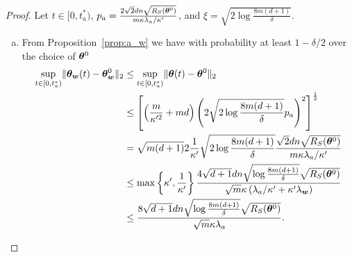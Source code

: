 \documentclass{article}
\begin{document}
\begin{proof}
    Let $t\in[0, t^*_a)$, $p_a=\frac{2\sqrt{2}dn\sqrt{R_S(\bm{\theta}^0)}}{m\kappa\lambda_a/\kappa'}$, and $\xi=\sqrt{2\log\frac{8m(d+1)}{\delta}}$.
    \begin{enumerate}[(a)]
        \item From Proposition~\ref{prop:a_w} we have with probability at least $1-\delta/2$ over the choice of $\bm{\theta}^0$
              \begin{equation*}
                  \begin{aligned}
                      \sup\limits_{t\in[0,t^*_a)}\lVert\bm{\theta}_{\bm{w}}(t)-\bm{\theta}_{\bm{w}}^0\rVert_2
                       & \leq \sup\limits_{t\in[0,t^*_a)}\lVert\bm{\theta}(t)-\bm{\theta}^0\rVert_2                                                                                                                                 \\
                       & \leq \left[\left(\frac{m}{\kappa'^2}+md\right)\left(2\sqrt{2\log\frac{8m(d+1)}{\delta}}p_a\right)^2\right]^{\frac{1}{2}}                                                                      \\
                       & =\sqrt{m(d+1)}2\frac{1}{\kappa'}\sqrt{2\log\frac{8m(d+1)}{\delta}}\frac{\sqrt{2}dn\sqrt{R_S(\bm{\theta}^0)}}{m\kappa\lambda_a/\kappa'}                                                            \\
                       & \leq\max\left\{\kappa',\frac{1}{\kappa'}\right\}\frac{4\sqrt{d+1}dn\sqrt{\log\frac{8m(d+1)}{\delta}}\sqrt{R_S(\bm{\theta}^0)}}{\sqrt{m}\kappa\left(\lambda_a/\kappa'+\kappa'\lambda_{\bm{w}}\right)} \\
                       & \leq\frac{8\sqrt{d+1}dn\sqrt{\log\frac{8m(d+1)}{\delta}}\sqrt{R_S(\bm{\theta}^0)}}{\sqrt{m}\kappa\lambda_a}.
                  \end{aligned}
              \end{equation*}


\end{enumerate}
\end{proof}
\end{document}
